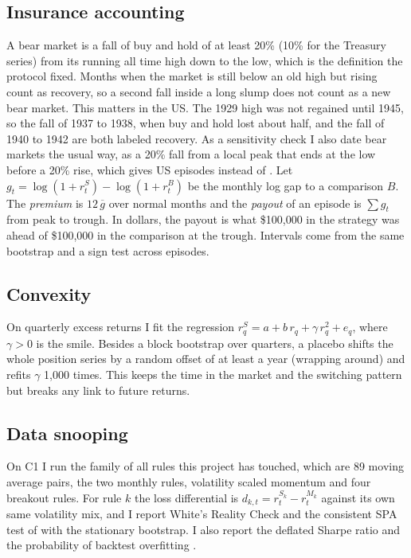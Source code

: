 \documentclass[11pt]{article}
\begin{document}
\subsection{Insurance accounting}
A bear market is a fall of buy and hold of at least 20\% (10\% for the Treasury series) from its running all time high down to the low, which is the definition the protocol fixed. Months when the market is still below an old high but rising count as recovery, so a second fall inside a long slump does not count as a new bear market. This matters in the US. The 1929 high was not regained until 1945, so the fall of 1937 to 1938, when buy and hold lost about half, and the fall of 1940 to 1942 are both labeled recovery. As a sensitivity check I also date bear markets the usual way, as a 20\% fall from a local peak that ends at the low before a 20\% rise, which gives  US episodes instead of . Let $g_t=\log(1+r^S_t)-\log(1+r^B_t)$ be the monthly log gap to a comparison $B$. The \emph{premium} is $12\,\overline{g}$ over normal months and the \emph{payout} of an episode is $\sum g_t$ from peak to trough. In dollars, the payout is what \$100{,}000 in the strategy was ahead of \$100{,}000 in the comparison at the trough. Intervals come from the same bootstrap and a sign test across episodes.

\subsection{Convexity}
On quarterly excess returns I fit the \citet{tm} regression $r^S_q=a+b\,r_q+\gamma\, r_q^2+e_q$, where $\gamma>0$ is the smile. Besides a block bootstrap over quarters, a placebo shifts the whole position series by a random offset of at least a year (wrapping around) and refits $\gamma$ 1{,}000 times. This keeps the time in the market and the switching pattern but breaks any link to future returns.

\subsection{Data snooping}
On C1 I run the family of all  rules this project has touched, which are 89 moving average pairs, the two monthly rules, volatility scaled momentum and four breakout rules. For rule $k$ the loss differential is $d_{k,t}=r^{S_k}_t-r^{M_k}_t$ against its own same volatility mix, and I report White's Reality Check \citep{white} and the consistent SPA test of \citet{hansen} with the stationary bootstrap. I also report the deflated Sharpe ratio \citep{dsr} and the probability of backtest overfitting \citep{pbo}.
\end{document}
